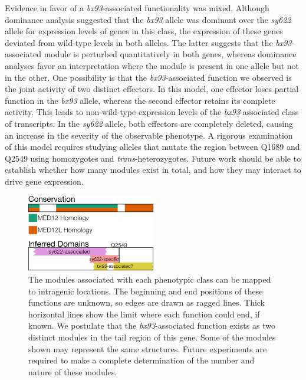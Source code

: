 \documentclass[10pt, twocolumn]{article}
\begin{document}
Evidence in favor of a \emph{bx93}-associated functionality was mixed. Although
dominance analysis suggested that the \emph{bx93} allele was dominant over the
\emph{sy622} allele for expression levels of genes in this class, the expression
of these genes deviated from wild-type levels in both alleles. The latter
suggests that the \emph{bx93}-associated module is perturbed quantitatively in
both genes, whereas dominance analyses favor an interpretation where the module
is present in one allele but not in the other. One possibility is that the
\emph{bx93}-associated function we observed is the joint activity of two
distinct effectors. In this model, one effector loses partial function in the
\emph{bx93} allele, whereas the second effector retains its complete activity.
This leads to non-wild-type expression levels of the \emph{bx93}-associated
class of transcripts. In the \emph{sy622} allele, both effectors are completely
deleted, causing an increase in the severity of the observable phenotype. A
rigorous examination of this model requires studying alleles that mutate the
region between Q1689 and Q2549 using homozygotes and \emph{trans}-heterozygotes.
Future work should be able to establish whether how many modules exist in total,
and how they may interact to drive gene expression.

\begin{figure}
  \centering{}
  \includegraphics[width=0.5\textwidth]{../figs/inferred_domains.pdf}
  \caption{
    The modules associated with each phenotypic class can be
    mapped to intragenic locations. The beginning and end positions of
    these functions are unknown,
    so edges are drawn as ragged lines. Thick horizontal lines show the
    limit where each function could end, if known. We postulate that the
    \emph{bx93}-associated function exists as two distinct modules in the tail
    region of this gene. Some of the modules shown may represent the same
    structures. Future experiments are required to make a complete determination
    of the number and nature of these modules.
  }
\label{fig:domains}
\end{figure}
\end{document}
